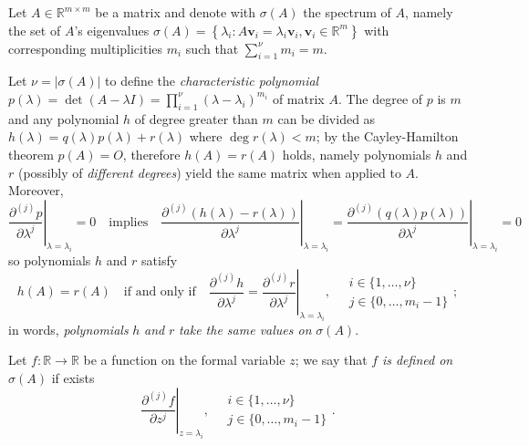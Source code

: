 
Let $A\in\mathbb{R}^{m\times m}$ be a matrix and denote with $\sigma(A)$ the
spectrum of $A$, namely the set of $A$'s eigenvalues
$\sigma(A) = \left\lbrace \lambda_{i}:
A\boldsymbol{v}_{i}=\lambda_{i}\boldsymbol{v}_{i},
\boldsymbol{v}_{i}\in\mathbb{R}^{m}\right\rbrace$
with corresponding multiplicities $m_{i}$ such that $ \sum_{i=1}^{\nu}{m_{i}}=m$.

Let $\nu=\left|\sigma(A)\right|$ to define the \textit{characteristic
polynomial} $p(\lambda)=\det{\left(A-\lambda
I\right)}=\prod_{i=1}^{\nu}{(\lambda - \lambda_{i})^{m_{i}}}$ of matrix $A$.
The degree of $p$ is $m$ and any polynomial $h$ of degree greater than $m$ can
be divided as $h(\lambda) = q(\lambda)p(\lambda)+r(\lambda)$ where
$\deg{r(\lambda) < m}$; by the Cayley-Hamilton theorem $p(A)=O$, therefore
$h(A) = r(A)$ holds, namely polynomials $h$ and $r$ (possibly of
\textit{different degrees}) yield the same matrix when applied to $A$.
Moreover,
\begin{displaymath}
\left. \frac{\partial^{(j)}{p}}{\partial{\lambda}^{j}} \right|_{\lambda=\lambda_{i}}=0
\quad\text{implies}\quad
\left.\frac{\partial^{(j)}\left(h(\lambda) - r(\lambda)\right)}{\partial\lambda^{j}}\right|_{\lambda=\lambda_{i}} =
\left.\frac{\partial^{(j)}\left(q(\lambda)p(\lambda)\right)}{\partial\lambda^{j}}\right|_{\lambda=\lambda_{i}} = 0
\end{displaymath}
so polynomials $h$ and $r$ satisfy 
\begin{displaymath}
h(A)=r(A) \quad\text{if and only if}\quad
\left.\frac{\partial^{(j)}h}{\partial\lambda^{j}}=\frac{\partial^{(j)}r}{\partial\lambda^{j}}\right|_{\lambda=\lambda_{i}},
\quad 
\begin{array}{l} 
    i\in \lbrace 1, \ldots, \nu \rbrace \\
    j \in \lbrace 0, \ldots, m_{i}-1 \rbrace
\end{array};
\end{displaymath}
in words, \textit{polynomials} $h$ \textit{and} $r$ \textit{take the same values on} $\sigma(A)$.

Let $f:\mathbb{R}\rightarrow \mathbb{R}$ be a function on the formal variable
$z$; we say that $f$ \textit{is defined on $\sigma(A)$} if exists
\begin{displaymath}
    \left. \frac{\partial^{(j)}{f}}{\partial{z}^{j}} \right|_{z=\lambda_{i}},
    \quad 
    \begin{array}{l} 
        i\in \lbrace 1, \ldots, \nu \rbrace \\
        j \in \lbrace 0, \ldots, m_{i}-1 \rbrace
    \end{array}.
\end{displaymath}

